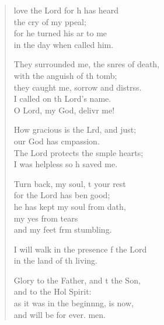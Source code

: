 \begin{verse}
  \begin{patverse}
 love the Lord for h has heard\Med\\
the cry of my ppeal;\\
for he turned his ar to me\Med\\
in the day when  called him.

They surrounded me, the snres of death,\Med\\
with the anguish of th tomb;\\
they caught me, sorrow and distrss.\Flex\\
I called on th Lord’s name.\Med\\
O Lord, my God, delivr me!

How gracious is the Lrd, and just;\Med\\
our God has cmpassion.\\
The Lord protects the s\pointup{\i}mple hearts;\Med\\
I was helpless so h saved me.

Turn back, my soul, t your rest\Med\\
for the Lord has ben good;\\
he has kept my soul from dath,\Flex\\
my yes from tears\Med\\
and my feet frm stumbling.

I will walk in the presence f the Lord\Med\\
in the land of th living.

Glory to the Father, and t the Son,\Med\\
and to the Hol Spirit:\\
as it was in the beginn\pointup{\i}ng, is now,\Med\\
and will be for ever. men.
  \end{patverse}
\end{verse}
